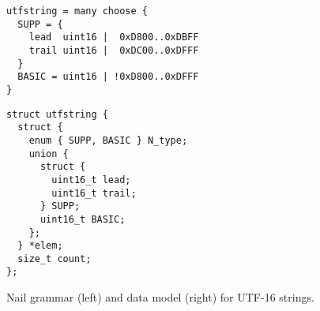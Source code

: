 \begin{figure*}
\smaller[0.5]
\begin{minipage}{\columnwidth}
\begin{verbatim}
utfstring = many choose {
  SUPP = {
    lead  uint16 |  0xD800..0xDBFF
    trail uint16 |  0xDC00..0xDFFF
  }
  BASIC = uint16 | !0xD800..0xDFFF
}
\end{verbatim}
\end{minipage}
\hspace{\columnsep}
\begin{minipage}{\columnwidth}
\begin{verbatim}
struct utfstring {
  struct {
    enum { SUPP, BASIC } N_type;
    union {
      struct {
        uint16_t lead;
        uint16_t trail;
      } SUPP;
      uint16_t BASIC;
    };
  } *elem;
  size_t count;
};
\end{verbatim}
\end{minipage}
\caption{Nail grammar (left) and data model (right) for UTF-16 strings.}
\label{fig:utf16}
\end{figure*}

